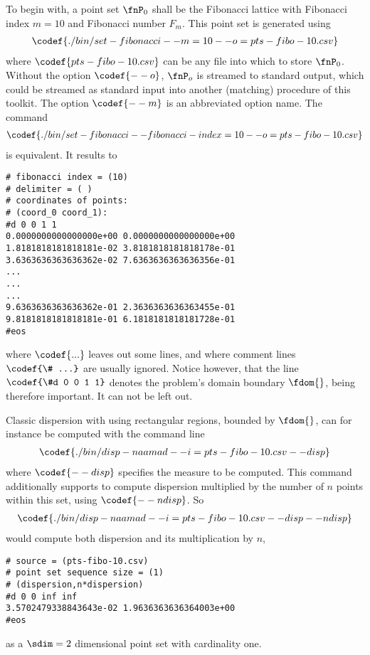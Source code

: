 %
To begin with, a point set $\fnP_0$ shall be the Fibonacci lattice with Fibonacci index $m=10$ and Fibonacci number $F_m$. This point set is generated using
\begin{align*}
  \codef{./bin/set-fibonacci --m=10 --o=pts-fibo-10.csv}
\end{align*}
where $\codef{pts-fibo-10.csv}$ can be any file into which to store $\fnP_0$. Without the option $\codef{--o}$, $\fnP_o$ is streamed to standard output, which could be streamed as standard input into another (matching) procedure of this toolkit. The option $\codef{--m}$ is an abbreviated option name. The command
\begin{align*}
  \codef{./bin/set-fibonacci --fibonacci-index=10 --o=pts-fibo-10.csv}
\end{align*}
is equivalent. It results to
\begin{verbatim}
# fibonacci index = (10)
# delimiter = ( )
# coordinates of points:
# (coord_0 coord_1):
#d 0 0 1 1
0.0000000000000000e+00 0.0000000000000000e+00
1.8181818181818181e-02 3.8181818181818178e-01
3.6363636363636362e-02 7.6363636363636356e-01
...
...
...
9.6363636363636362e-01 2.3636363636363455e-01
9.8181818181818181e-01 6.1818181818181728e-01
#eos
\end{verbatim}
where $\codef{...}$ leaves out some lines, and where comment lines $\codef{\# ...}$ are usually ignored. Notice however, that the line $\codef{\#d 0 0 1 1}$ denotes the problem's domain boundary $\fdom{}$, being therefore important. It can not be left out.

Classic dispersion with using rectangular regions, bounded by $\fdom{}$, can for instance be computed with the command line
\begin{align*}
  \codef{./bin/disp-naamad --i=pts-fibo-10.csv --disp}
\end{align*}
where $\codef{--disp}$ specifies the measure to be computed. This command additionally supports to compute dispersion multiplied by the number of $n$ points within this set, using $\codef{--ndisp}$. So
\begin{align*}
  \codef{./bin/disp-naamad --i=pts-fibo-10.csv --disp --ndisp}
\end{align*}
would compute both dispersion and its multiplication by $n$,
\begin{verbatim}
# source = (pts-fibo-10.csv)
# point set sequence size = (1)
# (dispersion,n*dispersion)
#d 0 0 inf inf
3.5702479338843643e-02 1.9636363636364003e+00
#eos
\end{verbatim}
as a $\sdim=2$ dimensional point set with cardinality one.

